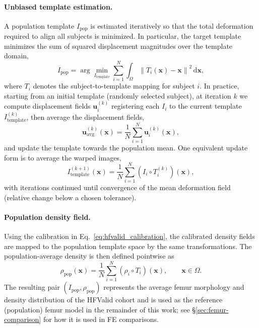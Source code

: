 \paragraph{Unbiased template estimation.}
A population template $I_{\mathrm{pop}}$ is estimated iteratively so that the total deformation required to align all subjects is minimized. In particular, the target template minimizes the sum of squared displacement magnitudes over the template domain,
\begin{equation}
I_{\mathrm{pop}} = \arg\min_{I_{\mathrm{template}}}\sum_{i=1}^{N}\int_{\Omega}\left\lVert T_i(\mathbf{x})-\mathbf{x}\right\rVert^2\,\mathrm{d}\mathbf{x},
\label{eq:template_energy}
\end{equation}
where $T_i$ denotes the subject-to-template mapping for subject $i$. In practice, starting from an initial template (randomly selected subject), at iteration $k$ we compute displacement fields $\mathbf{u}_i^{(k)}$ registering each $I_i$ to the current template $I_{\mathrm{template}}^{(k)}$, then average the displacement fields,
\begin{equation}
\mathbf{u}_{\mathrm{avg}}^{(k)}(\mathbf{x}) = \frac{1}{N}\sum_{i=1}^{N}\mathbf{u}_i^{(k)}(\mathbf{x}),
\label{eq:avg_displacement}
\end{equation}
and update the template towards the population mean. One equivalent update form is to average the warped images,
\begin{equation}
I_{\mathrm{template}}^{(k+1)}(\mathbf{x}) = \frac{1}{N}\sum_{i=1}^{N}\left(I_i\circ T_i^{(k)}\right)(\mathbf{x}),
\label{eq:template_update}
\end{equation}
with iterations continued until convergence of the mean deformation field (relative change below a chosen tolerance).

\paragraph{Population density field.}
Using the calibration in Eq.~\eqref{eq:hfvalid_calibration}, the calibrated density fields are mapped to the population template space by the same transformations. The population-average density is then defined pointwise as
\begin{equation}
\rho_{\mathrm{pop}}(\mathbf{x}) = \frac{1}{N}\sum_{i=1}^{N}\left(\rho_i\circ T_i\right)(\mathbf{x}),
\qquad \mathbf{x}\in\Omega.
\label{eq:rho_pop}
\end{equation}
The resulting pair $\left(I_{\mathrm{pop}},\rho_{\mathrm{pop}}\right)$ represents the average femur morphology and density distribution of the HFValid cohort and is used as the reference (population) femur model in the remainder of this work; see \S\ref{sec:femur-comparison} for how it is used in FE comparisons.

